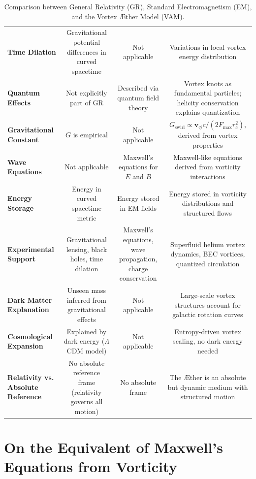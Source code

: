 \documentclass[a4paper,12pt]{article}
\begin{document}
\begin{landscape}
\begin{table}[htbp]
{\begin{tabular}{@{} l c c c @{}}
                \textbf{Time Dilation} & Gravitational potential differences in curved spacetime & Not applicable & Variations in local vortex energy distribution \\
                \textbf{Quantum Effects} & Not explicitly part of GR & Described via quantum field theory & Vortex knots as fundamental particles; helicity conservation explains quantization \\
                \textbf{Gravitational Constant} & $G$ is empirical & Not applicable & $G_\text{swirl} \propto \mathbf{v}_{\scriptscriptstyle\boldsymbol{\circlearrowleft}} c / (2 F_{\max} r_c^2)$, derived from vortex properties \\
                \textbf{Wave Equations} & Not applicable & Maxwell's equations for $E$ and $B$ & Maxwell-like equations derived from vorticity interactions \\
                \textbf{Energy Storage} & Energy in curved spacetime metric & Energy stored in EM fields & Energy stored in vorticity distributions and structured flows \\
                \textbf{Experimental Support} & Gravitational lensing, black holes, time dilation & Maxwell's equations, wave propagation, charge conservation & Superfluid helium vortex dynamics, BEC vortices, quantized circulation \\
                \textbf{Dark Matter Explanation} & Unseen mass inferred from gravitational effects & Not applicable & Large-scale vortex structures account for galactic rotation curves \\
                \textbf{Cosmological Expansion} & Explained by dark energy ($\Lambda$CDM model) & Not applicable & Entropy-driven vortex scaling, no dark energy needed \\
                \textbf{Relativity vs. Absolute Reference} & No absolute reference frame (relativity governs all motion) & No absolute frame & The Æther is an absolute but dynamic medium with structured motion \\
                \bottomrule
            \end{tabular}%
        }
        \caption{Comparison between General Relativity (GR), Standard Electromagnetism (EM), and the Vortex Æther Model (VAM).}
        \label{tab:comparison}
    \end{table}
\end{landscape}  %

    \section{On the Equivalent of Maxwell's Equations from Vorticity}
\end{document}

